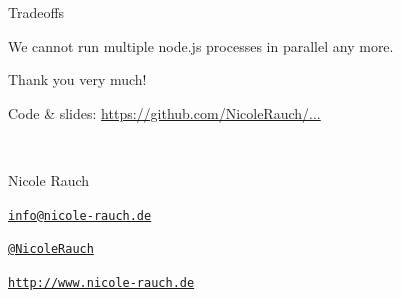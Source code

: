 





\begin{frame}[fragile]{Tradeoffs}

We cannot run multiple node.js processes in parallel any more.

\end{frame}


\begin{frame}{Thank you very much!}

        Code \& slides: \url{https://github.com/NicoleRauch/...}
        
        ~\\[1em]
        \begin{block}{Nicole Rauch}
        \begin{description}[Twitterxx]
                \item[E-Mail]  \href{mailto:info@nicole-rauch.de}{\texttt{info@nicole-rauch.de}}
                \item[Twitter] \href{http://twitter.com/NicoleRauch}{\texttt{@NicoleRauch}}
                \item[Web] \href{http://www.nicole-rauch.de}{\texttt{http://www.nicole-rauch.de}}
        \end{description}
        \end{block}
\end{frame}

